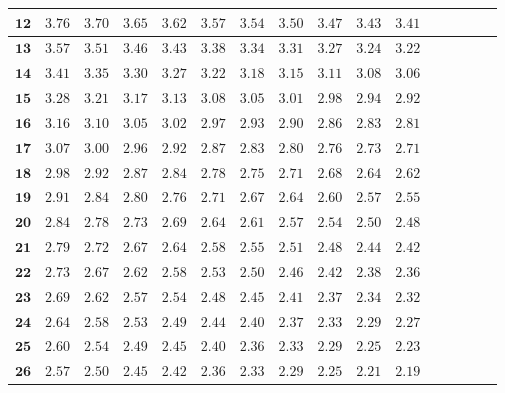 \begin{longtable}{|r|r|r|r|r|r|r|r|r|r|r|r|r|r|r|r|}
    \(\mathbf{12}\) & \(3.76\) & \(3.70\) & \(3.65\) & \(3.62\) & \(3.57\) & \(3.54\) & \(3.50\) & \(3.47\) & \(3.43\) & \(3.41\) \\  \hline 
    \(\mathbf{13}\) & \(3.57\) & \(3.51\) & \(3.46\) & \(3.43\) & \(3.38\) & \(3.34\) & \(3.31\) & \(3.27\) & \(3.24\) & \(3.22\) \\  \hline 
    \(\mathbf{14}\) & \(3.41\) & \(3.35\) & \(3.30\) & \(3.27\) & \(3.22\) & \(3.18\) & \(3.15\) & \(3.11\) & \(3.08\) & \(3.06\) \\  \hline 
    \(\mathbf{15}\) & \(3.28\) & \(3.21\) & \(3.17\) & \(3.13\) & \(3.08\) & \(3.05\) & \(3.01\) & \(2.98\) & \(2.94\) & \(2.92\) \\  \hline 
    \(\mathbf{16}\) & \(3.16\) & \(3.10\) & \(3.05\) & \(3.02\) & \(2.97\) & \(2.93\) & \(2.90\) & \(2.86\) & \(2.83\) & \(2.81\) \\  \hline 
    \(\mathbf{17}\) & \(3.07\) & \(3.00\) & \(2.96\) & \(2.92\) & \(2.87\) & \(2.83\) & \(2.80\) & \(2.76\) & \(2.73\) & \(2.71\) \\  \hline 
    \(\mathbf{18}\) & \(2.98\) & \(2.92\) & \(2.87\) & \(2.84\) & \(2.78\) & \(2.75\) & \(2.71\) & \(2.68\) & \(2.64\) & \(2.62\) \\  \hline 
    \(\mathbf{19}\) & \(2.91\) & \(2.84\) & \(2.80\) & \(2.76\) & \(2.71\) & \(2.67\) & \(2.64\) & \(2.60\) & \(2.57\) & \(2.55\) \\  \hline 
    \(\mathbf{20}\) & \(2.84\) & \(2.78\) & \(2.73\) & \(2.69\) & \(2.64\) & \(2.61\) & \(2.57\) & \(2.54\) & \(2.50\) & \(2.48\) \\  \hline 
    \(\mathbf{21}\) & \(2.79\) & \(2.72\) & \(2.67\) & \(2.64\) & \(2.58\) & \(2.55\) & \(2.51\) & \(2.48\) & \(2.44\) & \(2.42\) \\  \hline 
    \(\mathbf{22}\) & \(2.73\) & \(2.67\) & \(2.62\) & \(2.58\) & \(2.53\) & \(2.50\) & \(2.46\) & \(2.42\) & \(2.38\) & \(2.36\) \\  \hline 
    \(\mathbf{23}\) & \(2.69\) & \(2.62\) & \(2.57\) & \(2.54\) & \(2.48\) & \(2.45\) & \(2.41\) & \(2.37\) & \(2.34\) & \(2.32\) \\  \hline 
    \(\mathbf{24}\) & \(2.64\) & \(2.58\) & \(2.53\) & \(2.49\) & \(2.44\) & \(2.40\) & \(2.37\) & \(2.33\) & \(2.29\) & \(2.27\) \\  \hline 
    \(\mathbf{25}\) & \(2.60\) & \(2.54\) & \(2.49\) & \(2.45\) & \(2.40\) & \(2.36\) & \(2.33\) & \(2.29\) & \(2.25\) & \(2.23\) \\  \hline 
    \(\mathbf{26}\) & \(2.57\) & \(2.50\) & \(2.45\) & \(2.42\) & \(2.36\) & \(2.33\) & \(2.29\) & \(2.25\) & \(2.21\) & \(2.19\) \\  \hline 

\end{longtable}
